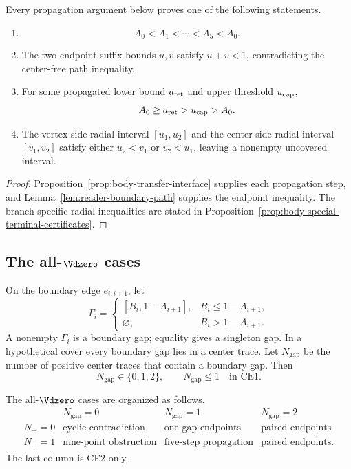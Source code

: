 \begin{proposition}
\label{prop:body-strategy2-chain-principle}
Every propagation argument below proves one of the following statements.
\begin{enumerate}
\item
\[
 A_0<A_1<\cdots<A_5<A_0.
\]
\item The two endpoint suffix bounds $u,v$ satisfy $u+v<1$, contradicting the
center-free path inequality.
\item For some propagated lower bound $a_{\rm ret}$ and upper threshold
$u_{\rm cap}$,
\[
 A_0\ge a_{\rm ret}>u_{\rm cap}>A_0.
\]
\item The vertex-side radial interval $[u_1,u_2]$ and the center-side radial
interval $[v_1,v_2]$ satisfy either $u_2<v_1$ or $v_2<u_1$, leaving a
nonempty uncovered interval.
\end{enumerate}
\end{proposition}

\begin{proof}
Proposition~\ref{prop:body-transfer-interface} supplies each propagation step,
and Lemma~\ref{lem:reader-boundary-path} supplies the endpoint inequality.
The branch-specific radial inequalities are stated in
Proposition~\ref{prop:body-special-terminal-certificates}.
\end{proof}

\subsection{The all-$\Vdzero$ cases}

\begin{definition}
\label{def:body-boundary-gap-count}
On the boundary edge $e_{i,i+1}$, let
\[
 \Gamma_i=
 \begin{cases}
 [B_i,1-A_{i+1}],&B_i\le1-A_{i+1},\\
 \varnothing,&B_i>1-A_{i+1}.
 \end{cases}
\]
A nonempty $\Gamma_i$ is a boundary gap; equality gives a singleton gap.  In
a hypothetical cover every boundary gap lies in a center trace.  Let
$N_{\mathrm{gap}}$ be the number of positive center traces that contain a
boundary gap.  Then
\[
 N_{\mathrm{gap}}\in\{0,1,2\},
 \qquad
 N_{\mathrm{gap}}\le1\quad\text{in CE1}.
\]
\end{definition}

The all-$\Vdzero$ cases are organized as follows.
\[
\begin{array}{c|ccc}
 &N_{\mathrm{gap}}=0&N_{\mathrm{gap}}=1&N_{\mathrm{gap}}=2\\ \hline
N_+=0&\text{cyclic contradiction}&\text{one-gap endpoints}&
       \text{paired endpoints}\\
N_+=1&\text{nine-point obstruction}&\text{five-step propagation}&
       \text{paired endpoints}.
\end{array}
\]
The last column is CE2-only.

